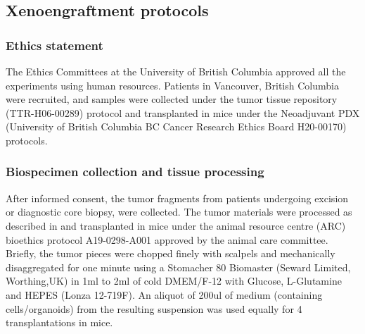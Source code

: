 \documentclass{article}
\begin{document}


\subsection{Xenoengraftment protocols} 
\subsubsection{Ethics statement}
The Ethics Committees at the University of British Columbia approved all the experiments using human resources.  
Patients in Vancouver, British Columbia were recruited, and samples were collected under the tumor tissue repository (TTR-H06-00289) protocol and transplanted in mice under the Neoadjuvant PDX (University of British Columbia BC Cancer Research Ethics Board H20-00170) protocols.

\subsubsection{Biospecimen collection and tissue processing}
After informed consent, the tumor fragments from patients undergoing excision or diagnostic core biopsy, were collected. 
The tumor materials were processed as described in \cite {eirew2015dynamics} and transplanted in mice under the animal resource centre (ARC) bioethics protocol A19-0298-A001 approved by the animal care committee.
Briefly, the tumor pieces were chopped finely with scalpels and mechanically disaggregated for one minute using a Stomacher 80 Biomaster (Seward Limited, Worthing,UK) in 1ml to 2ml of cold DMEM/F-12 with Glucose, L-Glutamine and HEPES (Lonza 12-719F).
An aliquot of 200ul of medium (containing cells/organoids) from the resulting suspension was used equally for 4 transplantations in mice.
\end{document}
